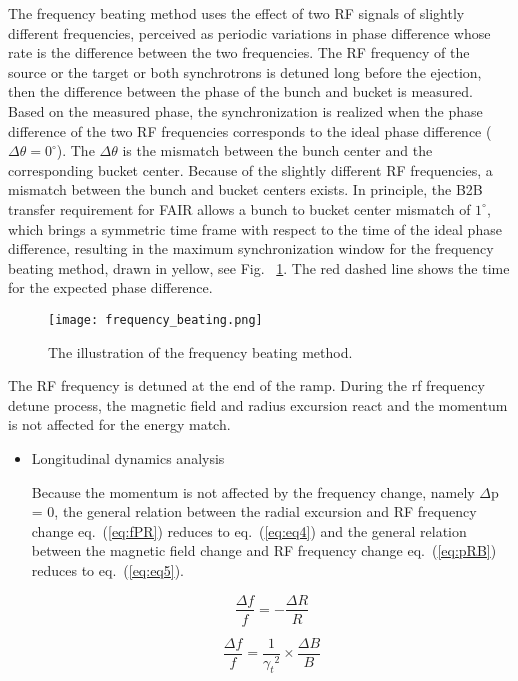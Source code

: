 The frequency beating method uses the effect of two RF signals of slightly different frequencies, perceived as periodic variations in phase difference whose rate is the difference between the two frequencies. The RF frequency of the source or the target or both synchrotrons is detuned long before the ejection, then the difference between the phase of the bunch and bucket is measured. Based on the measured phase, the synchronization is realized when the phase difference of the two RF frequencies corresponds to the ideal phase difference ($\Delta \theta = 0^\circ$). The $\Delta \theta$ is the mismatch between the bunch center and the corresponding bucket center. Because of the slightly different RF frequencies, a mismatch between the bunch and bucket centers exists. In principle, the B2B transfer requirement for FAIR allows a bunch to bucket center mismatch of $1^\circ$, which brings a symmetric time frame with respect to the time of the ideal phase difference, resulting in the maximum synchronization window for the frequency beating method, drawn in yellow, see Fig. ~\ref{frequency_beat}. The red dashed line shows the time for the expected phase difference.

\begin{figure}[!htb]
   \centering   
   \texttt{[image: frequency\_beating.png]}
   \caption{The illustration of the frequency beating method.}
   \label{frequency_beat}
\end{figure}

The RF frequency is detuned at the end of the ramp. During the rf frequency detune process, the magnetic field and radius excursion react and the momentum is not affected for the energy match.

\begin {itemize}
\item Longitudinal dynamics analysis

Because the momentum is not affected by the frequency change, namely $\Delta$p = 0, the general relation between the radial excursion and RF frequency change eq.~(\ref{eq:fPR}) reduces to eq.~(\ref{eq:eq4}) and the general relation between the magnetic field change and RF frequency change eq.~(\ref{eq:pRB}) reduces to eq.~(\ref{eq:eq5}).

\begin{equation}
\frac{\Delta{f}}{f} = - \frac{\Delta{R}}{R}
\label{eq:eq4}
\end{equation}

\begin{equation}
\frac{\Delta{f}}{f} =  \frac{1}{{\gamma_t}^2}\times{\frac{\Delta{B}}{B}}
\label{eq:eq5}
\end{equation}
\end {itemize}

